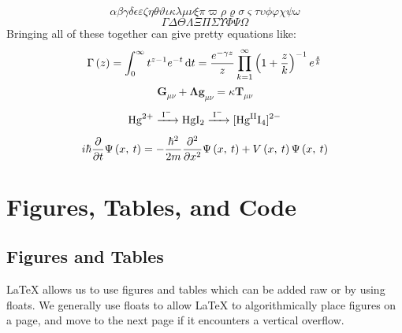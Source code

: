 \documentclass[11pt, twoside]{article}
\begin{document}
\begin{equation*}
    \alpha \beta \gamma \delta \epsilon \varepsilon \zeta \eta \theta \vartheta \iota \kappa \lambda \mu \nu \xi \pi \varpi \rho \varrho \sigma \varsigma \tau \upsilon \phi \varphi \chi \psi \omega
\end{equation*}
\begin{equation*}
    \Gamma \Delta \Theta \Lambda \Xi \Pi \Sigma \Upsilon \Phi \Psi \Omega
\end{equation*}
Bringing all of these together can give pretty equations like:
\begin{equation*}
    \Gamma\left( z \right) = \int_0^\infty t^{z - 1} e^{-t} \odif{t} = \frac{e^{-\gamma z}}{z} \prod_{k = 1}^\infty \left( 1 + \frac{z}{k} \right)^{-1} e^{\frac{z}{k}}
\end{equation*}
\begin{equation*}
    \symbf{G}_{\mu \nu} + \symbf{\Lambda} \symbf{g}_{\mu \nu} = \kappa \symbf{T}_{\mu \nu}
\end{equation*}
\begin{equation*}
    \ce{Hg^2+ ->[I-] HgI2 ->[I-] [Hg^{II}I4]^2-}
\end{equation*}
\begin{equation}\label{eq:schrodingers_equation}
    i \hbar \pdv*{\Psi\left( x,\: t \right)}{t} = -\frac{\hbar^2}{2m} \pdv[order=2]{}{x} \Psi\left( x,\: t \right) + V\left( x,\: t \right) \Psi\left( x,\: t \right)
\end{equation}
\newpage
\section{Figures, Tables, and Code}
\subsection{Figures and Tables}\label{sec:figures_and_tables}
\LaTeX{} allows us to use figures and tables which can be added raw or by using floats.
We generally use floats to allow \LaTeX{} to algorithmically place figures on a page, and
move to the next page if it encounters a vertical overflow.
\end{document}
